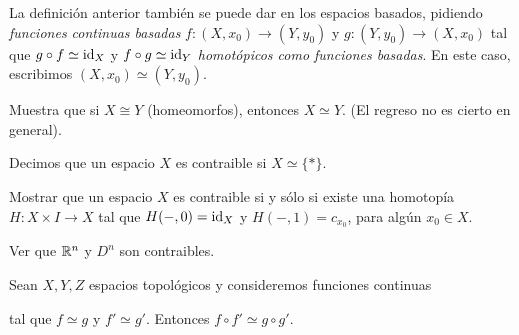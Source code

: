         La definición anterior también se puede dar en los espacios basados, pidiendo \textit{funciones continuas basadas} $f:(X,x_0)\to (Y,y_0)$ y $g:(Y,y_0)\to (X,x_0)$ tal que $g\circ f\simeq \mathrm{id}_X$ y $f\circ g\simeq \mathrm{id}_Y$ \textit{homotópicos como funciones basadas}. En este caso, escribimos $(X,x_0)\simeq (Y,y_0).$
    \begin{ejercicio}
        Muestra que si $X\cong Y$ (homeomorfos), entonces $X\simeq Y$. (El regreso no es cierto en general).
    \end{ejercicio}
    \begin{definicion}
        Decimos que un espacio $X$ es contraible si $X\simeq \{*\}$.
    \end{definicion}
    \begin{ejercicio}
        Mostrar que un espacio $X$ es contraible si y sólo si existe una homotopía $H:X\times I\to X$ tal que $H(-,0)=\mathrm{id}_X$ y $H(-,1)=c_{x_0}$, para algún $x_0\in X$.
    \end{ejercicio}
    \begin{ejercicio}
        Ver que $\mathbb{R}^n$ y $D^n$ son contraibles.
    \end{ejercicio}
    \begin{prop}
    \label{prop:homotopia_compatible_composicion}
        Sean $X,Y,Z$ espacios topológicos y consideremos funciones continuas
        \begin{center}
        \end{center}
        tal que $f\simeq g$ y $f'\simeq g'$. Entonces $f\circ f'\simeq g\circ g'$. 
    \end{prop}

